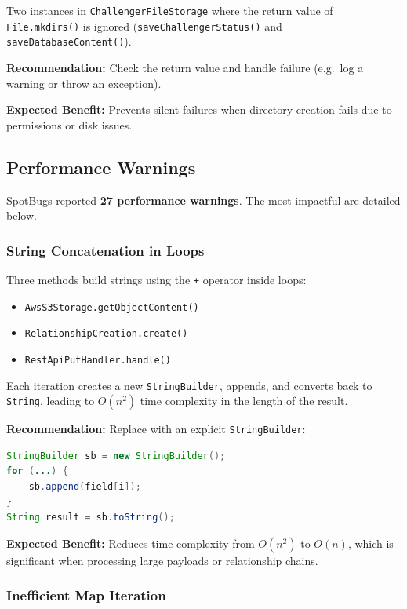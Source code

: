 \documentclass[11pt,a4paper]{article}
\begin{document}
Two instances in \texttt{ChallengerFileStorage} where the return value of \texttt{File.mkdirs()} is ignored (\texttt{saveChallengerStatus()} and \texttt{saveDatabaseContent()}).

\noindent\textbf{Recommendation:} Check the return value and handle failure (e.g.\ log a warning or throw an exception).

\noindent\textbf{Expected Benefit:} Prevents silent failures when directory creation fails due to permissions or disk issues.

\subsection{Performance Warnings}

SpotBugs reported \textbf{27 performance warnings}. The most impactful are detailed below.

\subsubsection{String Concatenation in Loops}

Three methods build strings using the \texttt{+} operator inside loops:
\begin{itemize}
    \item \texttt{AwsS3Storage.getObjectContent()}
    \item \texttt{RelationshipCreation.create()}
    \item \texttt{RestApiPutHandler.handle()}
\end{itemize}

\noindent Each iteration creates a new \texttt{StringBuilder}, appends, and converts back to \texttt{String}, leading to $O(n^2)$ time complexity in the length of the result.

\noindent\textbf{Recommendation:} Replace with an explicit \texttt{StringBuilder}:
\begin{lstlisting}[language=Java]
StringBuilder sb = new StringBuilder();
for (...) {
    sb.append(field[i]);
}
String result = sb.toString();
\end{lstlisting}

\noindent\textbf{Expected Benefit:} Reduces time complexity from $O(n^2)$ to $O(n)$, which is significant when processing large payloads or relationship chains.

\subsubsection{Inefficient Map Iteration}
\end{document}
